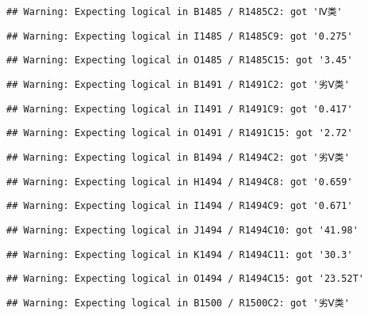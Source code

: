 \documentclass[
]{article}
\begin{document}
\begin{verbatim}
## Warning: Expecting logical in B1485 / R1485C2: got 'Ⅳ类'
\end{verbatim}

\begin{verbatim}
## Warning: Expecting logical in I1485 / R1485C9: got '0.275'
\end{verbatim}

\begin{verbatim}
## Warning: Expecting logical in O1485 / R1485C15: got '3.45'
\end{verbatim}

\begin{verbatim}
## Warning: Expecting logical in B1491 / R1491C2: got '劣Ⅴ类'
\end{verbatim}

\begin{verbatim}
## Warning: Expecting logical in I1491 / R1491C9: got '0.417'
\end{verbatim}

\begin{verbatim}
## Warning: Expecting logical in O1491 / R1491C15: got '2.72'
\end{verbatim}

\begin{verbatim}
## Warning: Expecting logical in B1494 / R1494C2: got '劣Ⅴ类'
\end{verbatim}

\begin{verbatim}
## Warning: Expecting logical in H1494 / R1494C8: got '0.659'
\end{verbatim}

\begin{verbatim}
## Warning: Expecting logical in I1494 / R1494C9: got '0.671'
\end{verbatim}

\begin{verbatim}
## Warning: Expecting logical in J1494 / R1494C10: got '41.98'
\end{verbatim}

\begin{verbatim}
## Warning: Expecting logical in K1494 / R1494C11: got '30.3'
\end{verbatim}

\begin{verbatim}
## Warning: Expecting logical in O1494 / R1494C15: got '23.52T'
\end{verbatim}

\begin{verbatim}
## Warning: Expecting logical in B1500 / R1500C2: got '劣Ⅴ类'
\end{verbatim}
\end{document}
